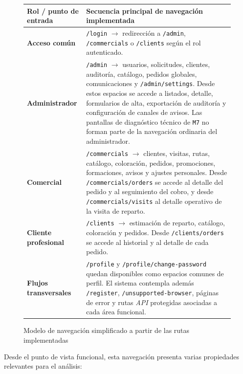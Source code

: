 \begin{figure}[H]
    \centering
    \renewcommand{\arraystretch}{1.25}
    \begin{tabularx}{\textwidth}{|p{}|X|}
        \hline
        \textbf{Rol / punto de entrada} & \textbf{Secuencia principal de navegación implementada} \\
        \hline
        \textbf{Acceso común} & \texttt{/login} $\rightarrow$ redirección a \texttt{/admin}, \texttt{/commercials} o \texttt{/clients} según el rol autenticado. \\
        \hline
        \textbf{Administrador} & \texttt{/admin} $\rightarrow$ usuarios, solicitudes, clientes, auditoría, catálogo, pedidos globales, comunicaciones y \texttt{/admin/settings}. Desde estos espacios se accede a listados, detalle, formularios de alta, exportación de auditoría y configuración de canales de avisos. Las pantallas de diagnóstico técnico de \texttt{M7} no forman parte de la navegación ordinaria del administrador. \\
        \hline
        \textbf{Comercial} & \texttt{/commercials} $\rightarrow$ clientes, visitas, rutas, catálogo, coloración, pedidos, promociones, formaciones, avisos y ajustes personales. Desde \texttt{/commercials/orders} se accede al detalle del pedido y al seguimiento del cobro, y desde \texttt{/commercials/visits} al detalle operativo de la visita de reparto. \\
        \hline
        \textbf{Cliente profesional} & \texttt{/clients} $\rightarrow$ estimación de reparto, catálogo, coloración y pedidos. Desde \texttt{/clients/orders} se accede al historial y al detalle de cada pedido. \\
        \hline
        \textbf{Flujos transversales} & \texttt{/profile} y \texttt{/profile/change-password} quedan disponibles como espacios comunes de perfil. El sistema contempla además \texttt{/register}, \texttt{/unsupported-browser}, páginas de error y rutas \textit{API} protegidas asociadas a cada área funcional. \\
        \hline
    \end{tabularx}
    \caption{Modelo de navegación simplificado a partir de las rutas implementadas}
    \label{fig:NavigationModel}
\end{figure}

Desde el punto de vista funcional, esta navegación presenta varias propiedades relevantes para el análisis:

